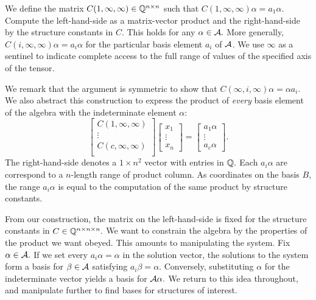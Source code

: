 \documentclass[../thesis.tex]{subfiles}
\begin{document}
We define the matrix $C(1,\infty,\infty)\in\mathbb{Q}^{n\times n}$ such that $C(1,\infty,\infty)\alpha=a_1\alpha$. Compute the left-hand-side as a matrix-vector product and the right-hand-side by the structure constants in $C.$ This holds for any $\alpha\in\mathcal{A}.$ More generally, $C(i,\infty,\infty)\alpha = a_i\alpha$ for the particular basis element $a_i$ of $\mathcal{A}$. We use $\infty$ as a sentinel to indicate complete access to the full range of values of the specified axis of the tensor.

We remark that the argument is symmetric to show that $C(\infty,i,\infty)\alpha = \alpha a_i.$ We also abstract this construction to express the product of \textit{every} basis element of the algebra with the indeterminate element $\alpha:$
\begin{equation}\label{eq:FindingElementsSystem}
    \begin{bmatrix} 
    C(1,\infty,\infty)\\
    \vdots\\
    C(c,\infty,\infty)\\
    \end{bmatrix}
    \begin{bmatrix}
        x_1\\\vdots\\x_n
    \end{bmatrix}
    = 
    \begin{bmatrix}
    a_1\alpha\\
    \vdots\\
    a_c\alpha
    \end{bmatrix}.
\end{equation}
The right-hand-side denotes a $1\times n^2$ vector with entries in $\mathbb{Q}.$ Each $a_i\alpha$ are correspond to a $n$-length range of product column. As coordinates on the basis $B$, the range $a_i\alpha$ is equal to the computation of the same product by structure constants.

From our construction, the matrix on the left-hand-side is fixed for the structure constants in $C\in\mathbb{Q}^{n\times n\times n}.$ We want to constrain the algebra by the properties of the product we want obeyed. This amounts to manipulating the system. Fix $\alpha\in\mathcal{A}.$ If we set every $a_i\alpha = \alpha$ in the solution vector, the solutions to the system form a basis for $\beta\in\mathcal{A}$ satisfying $a_i\beta = \alpha.$ Conversely, substituting $\alpha$ for the indeterminate vector yields a basis for $\mathcal{A}\alpha.$ We return to this idea throughout, and manipulate further to find bases for structures of interest.
\end{document}
